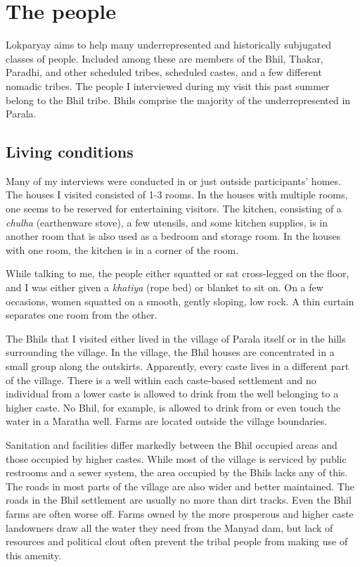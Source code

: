 \documentclass[report.tex]{subfiles}
\begin{document}
\section{The people}\label{sec:people}

Lokparyay aims to help many underrepresented and historically subjugated classes of people. Included among these are members of the Bhil, Thakar, Paradhi, and other scheduled tribes, scheduled castes, and a few different nomadic tribes. The people I interviewed during my visit this past summer belong to the Bhil tribe. Bhils comprise the majority of the underrepresented in Parala.

\subsection{Living conditions}\label{subsec:living}

Many of my interviews were conducted in or just outside participants' homes. The houses I visited consisted of 1-3 rooms. In the houses with multiple rooms, one seems to be reserved for entertaining visitors. The kitchen, consisting of a \textit{chulha} (earthenware stove), a few utensils, and some kitchen supplies, is in another room that is also used as a bedroom and storage room. In the houses with one room, the kitchen is in a corner of the room.

While talking to me, the people either squatted or sat cross-legged on the floor, and I was either given a \textit{khatiya} (rope bed) or blanket to sit on. On a few occasions, women squatted on a smooth, gently sloping, low rock. A thin curtain separates one room from the other.

The Bhils that I visited either lived in the village of Parala itself or in the hills surrounding the village. In the village, the Bhil houses are concentrated in a small group along the outskirts. Apparently, every caste lives in a different part of the village. There is a well within each caste-based settlement and no individual from a lower caste is allowed to drink from the well belonging to a higher caste. No Bhil, for example, is allowed to drink from or even touch the water in a Maratha well. Farms are located outside the village boundaries.

Sanitation and facilities differ markedly between the Bhil occupied areas and those occupied by higher castes. While most of the village is serviced by public restrooms and a sewer system, the area occupied by the Bhils lacks any of this. The roads in most parts of the village are also wider and better maintained. The roads in the Bhil settlement are usually no more than dirt tracks. Even the Bhil farms are often worse off. Farms owned by the more prosperous and higher caste landowners draw all the water they need from the Manyad dam, but lack of resources and political clout often prevent the tribal people from making use of this amenity.
\end{document}
